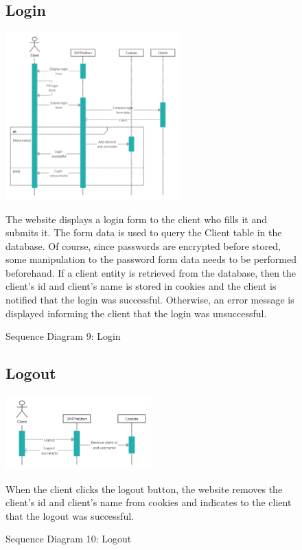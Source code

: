 \documentclass[11pt]{article}
\newcounter{use case ID}
\begin{document}
\begin{figure}[ht!]
    \subsection{Login}
    \centering
    \includegraphics[width=0.6\textwidth,height=0.3\paperheight]{Diagrams/Sequence/Login.jpg} 
    \caption{Sequence Diagram 9: Login}
    \label{fig: Login}
    \begin{flushleft}
        The website displays a login form to the client who fills it and submits it. The form data is used to query the Client table in the database. Of course, since passwords are encrypted before stored, some manipulation to the password form data needs to be performed beforehand. If a client entity is retrieved from the database, then the client’s id and client's name is stored in cookies and the client is notified that the login was successful. Otherwise, an error message is displayed informing the client that the login was unsuccessful.
    \end{flushleft}
\end{figure}

\begin{figure}[ht!]
    \subsection{Logout}
    \centering
    \includegraphics[width=0.5\textwidth,height=0.15\paperheight]{Diagrams/Sequence/Logout.jpg} 
    \caption{Sequence Diagram 10: Logout}
    \label{fig: Logout}
    \begin{flushleft}
        When the client clicks the logout button, the website removes the client’s id and client's name from cookies and indicates to the client that the logout was successful.
    \end{flushleft}
\end{figure}
\end{document}
